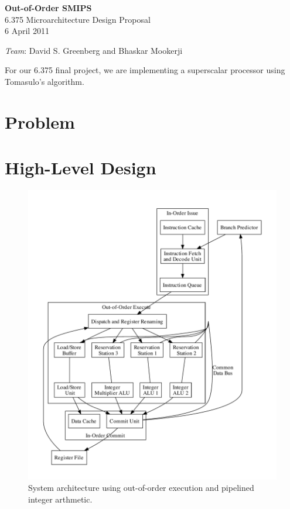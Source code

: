 \documentclass[12pt]{article}
\begin{document}
  \begin{center}
    \textbf{\large Out-of-Order SMIPS} \\
    6.375 Microarchitecture Design Proposal\\
    6 April 2011 \\
    
    \vspace{\baselineskip}
    
    \emph{Team}: David S. Greenberg and Bhaskar Mookerji
  \end{center}

For our 6.375 final project, we are implementing a superscalar processor using Tomasulo's algorithm.

\section{Problem\label{sec:problem}}

\section{High-Level Design}

\begin{figure}[ht!]
    \centering
    \includegraphics[width=\textwidth]{figures/design.pdf}
    \caption{System architecture using out-of-order execution and pipelined integer arthmetic. \label{fig:design}}
\end{figure}
\end{document}
